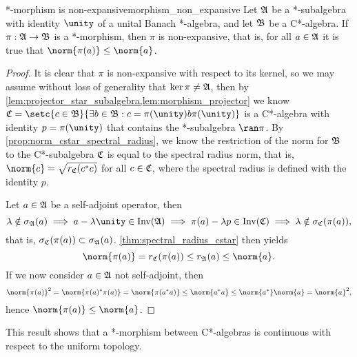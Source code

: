 \begin{proposition}{*-morphism is non-expansive}{morphism_non_expansive}
    Let \(\mathfrak{A}\) be a *-subalgebra with identity \(\unity\) of a unital Banach *-algebra, and let \(\mathfrak{B}\) be a C*-algebra. If \(\pi : \mathfrak{A} \to \mathfrak{B}\) is a *-morphism, then \(\pi\) is non-expansive, that is, for all \(a \in \mathfrak{A}\) it is true that \(\norm{\pi(a)} \leq \norm{a}\).
\end{proposition}
\begin{proof}
    It is clear that \(\pi\) is non-expansive with respect to its kernel, so we may assume without loss of generality that \(\ker\pi \neq \mathfrak{A}\), then by \cref{lem:projector_star_subalgebra,lem:morphism_projector} we know \(\algebra{C} = \setc{c \in \algebra{B}}{\exists b \in \algebra{B}: c = \pi(\unity)b\pi(\unity)}\) is a C*-algebra with identity \(p = \pi(\unity)\) that contains the *-subalgebra \(\ran\pi\). By \cref{prop:norm_cstar_spectral_radius}, we know the restriction of the norm for \(\mathfrak{B}\) to the C*-subalgebra \(\mathfrak{C}\) is equal to the spectral radius norm, that is, \(\norm{c} = \sqrt{r_{\algebra{C}}(c^*c)}\) for all \(c \in \mathfrak{C}\), where the spectral radius is defined with the identity \(p\).

    Let \(a \in \mathfrak{A}\) be a self-adjoint operator, then
    \begin{equation*}
        \lambda \notin \sigma_{\algebra{A}}(a) \implies a - \lambda \unity \in \invertible{\algebra{A}} \implies \pi(a) - \lambda p \in \invertible{\algebra{C}} \implies \lambda \notin \sigma_{\algebra{C}}(\pi(a)),
    \end{equation*}
    that is, \(\sigma_{\mathfrak{C}}(\pi(a))\subset \sigma_{\mathfrak{A}}(a)\). \cref{thm:spectral_radius_cstar} then yields
    \begin{equation*}
        \norm{\pi(a)} = r_{\algebra{C}}(\pi(a)) \leq r_{\algebra{A}}(a) \leq \norm{a}.
    \end{equation*}
    If we now consider \(a \in \mathfrak{A}\) not self-adjoint, then
    \begin{equation*}
        \norm{\pi(a)}^2 = \norm{\pi(a)^*\pi(a)} = \norm{\pi(a^*a)} \leq \norm{a^*a} \leq \norm{a^*}\norm{a} = \norm{a}^2,
    \end{equation*}
    hence \(\norm{\pi(a)} \leq \norm{a}\).
\end{proof}
\begin{remark}
    This result shows that a *-morphism between C*-algebras is continuous with respect to the uniform topology.
\end{remark}



